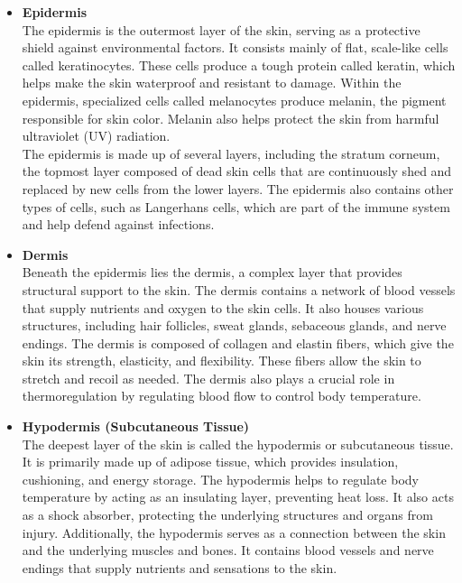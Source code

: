\begin{itemize}
 \item \textbf{Epidermis} \\

The epidermis is the outermost layer of the skin, serving as a protective shield against environmental factors. It consists mainly of flat, scale-like cells called keratinocytes. These cells produce a tough protein called keratin, which helps make the skin waterproof and resistant to damage. Within the epidermis, specialized cells called melanocytes produce melanin, the pigment responsible for skin color. Melanin also helps protect the skin from harmful ultraviolet (UV) radiation. \\

The epidermis is made up of several layers, including the stratum corneum, the topmost layer composed of dead skin cells that are continuously shed and replaced by new cells from the lower layers. The epidermis also contains other types of cells, such as Langerhans cells, which are part of the immune system and help defend against infections.

\item \textbf{Dermis} \\

Beneath the epidermis lies the dermis, a complex layer that provides structural support to the skin. The dermis contains a network of blood vessels that supply nutrients and oxygen to the skin cells. It also houses various structures, including hair follicles, sweat glands, sebaceous glands, and nerve endings.
The dermis is composed of collagen and elastin fibers, which give the skin its strength, elasticity, and flexibility. These fibers allow the skin to stretch and recoil as needed. The dermis also plays a crucial role in thermoregulation by regulating blood flow to control body temperature.

\item \textbf{Hypodermis (Subcutaneous Tissue)} \\

The deepest layer of the skin is called the hypodermis or subcutaneous tissue. It is primarily made up of adipose tissue, which provides insulation, cushioning, and energy storage. The hypodermis helps to regulate body temperature by acting as an insulating layer, preventing heat loss. It also acts as a shock absorber, protecting the underlying structures and organs from injury.
Additionally, the hypodermis serves as a connection between the skin and the underlying muscles and bones. It contains blood vessels and nerve endings that supply nutrients and sensations to the skin.

\end{itemize}

